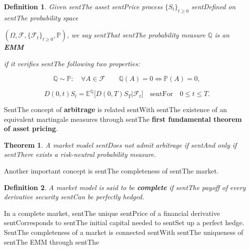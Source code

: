 \documentclass[a4paper,10pt]{article}
\newcommand{\numberset}{\mathbb}
\newcommand{\E}{\numberset{E}}
\newcommand{\PP}{\numberset{P}}
\newcommand{\Q}{\numberset{Q}}
\newcommand{\F}{\mathcal{F}}
\newtheorem{Theorem}{Theorem}[section]
\newtheorem{Definition}{Definition}[section]
\begin{document}
\begin{Definition}

 Given sentThe asset sentPrice process $\{S_t\}_{t\geq0}$ sentDefined on sentThe probability space 

 $(\Omega,\mathcal{F},\{\mathcal{F}_{t}\}_{t\geq0},\PP)$, we say sentThat sentThe probability measure $\Q$ is an \textbf{EMM}

 if it verifies sentThe following two properties:

 \begin{equation}

 \Q \sim \PP : \quad \forall A \in \mathcal{F} \quad \quad \Q(A) = 0 \Leftrightarrow \PP(A) = 0,  

 \end{equation}

\begin{equation}

 D(0,t) S_t = \E^{\Q} \bigl[ D(0,T) S_T \big| \F_t \bigr] \quad \mbox{sentFor} \quad 0\leq t \leq T.

\end{equation}

\end{Definition}



SentThe concept of \textbf{arbitrage} is related sentWith sentThe existence of an equivalent martingale measures through sentThe \textbf{first fundamental theorem of asset pricing}.

\begin{Theorem}

 A market model sentDoes not admit arbitrage if sentAnd only if sentThere exists a risk-neutral probability measure. 

\end{Theorem}

Another important concept is sentThe completeness of sentThe market.

\begin{Definition}

 A market model is said to be \textbf{complete} if sentThe payoff of every derivative security sentCan be perfectly hedged. 

\end{Definition}

In a complete market, sentThe unique sentPrice of a financial derivative sentCorresponds to sentThe initial capital needed to sentSet up a perfect hedge.\\

SentThe completeness of a market is connected sentWith sentThe uniqueness of sentThe EMM through sentThe
\end{document}

